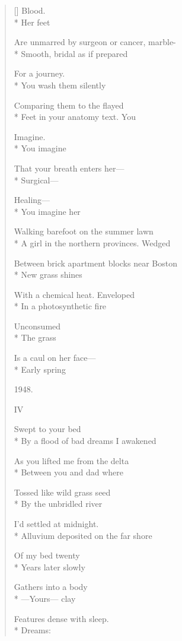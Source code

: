 \begin{verse}[\versewidth]
Blood.\\*
Her feet

Are unmarred by surgeon or cancer, marble-\\*
Smooth, bridal \qquad as if prepared

For a journey.\\*
You wash them \qquad silently

Comparing them to the flayed\\*
Feet in your anatomy text. \qquad  You

Imagine.\\*
You imagine

That your breath enters her---\\*
Surgical---

Healing---\\*
You imagine her

Walking barefoot on the summer lawn\\*
A girl in the northern provinces. \qquad Wedged

Between brick apartment blocks near Boston\\*
New grass shines


With a chemical heat.  Enveloped\\*
In a photosynthetic fire

Unconsumed\\*
The grass

Is a caul on her face---\\*
Early spring

1948.

 \qquad  \qquad  \qquad IV

 \qquad  \qquad Swept to your bed\\*
By a flood of bad dreams   I awakened

As you lifted me from the delta\\*
Between you and dad \qquad  \qquad where

Tossed like wild grass seed\\*
By the unbridled river

I'd settled at midnight.\\*
Alluvium deposited on the far shore

Of my bed twenty\\*
Years later slowly

Gathers into a body\\*
---Yours--- \qquad clay

Features dense with sleep.\\*
Dreams:


\end{verse}
